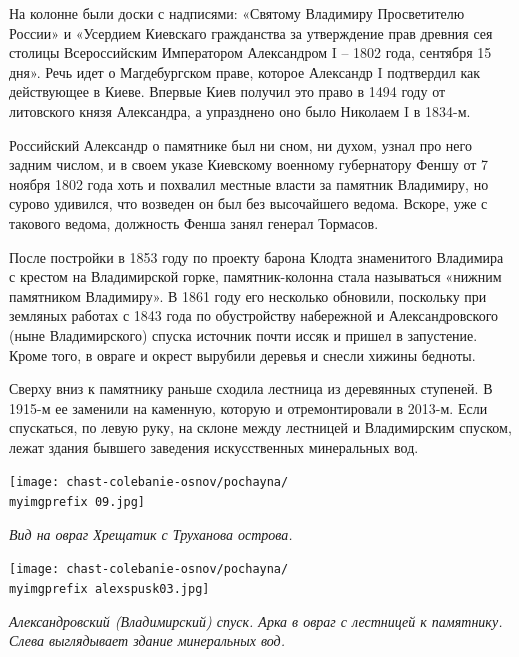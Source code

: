 На колонне были доски с надписями: «Святому Владимиру Просветителю России» и «Усердием Киевскаго гражданства за утверждение прав древния сея столицы Всероссийским Императором Александром I – 1802 года, сентября 15 дня». Речь идет о Магдебургском праве, которое Александр I подтвердил как действующее в Киеве. Впервые Киев получил это право в 1494 году от литовского князя Александра, а упразднено оно было Николаем I в 1834-м.

Российский Александр о памятнике был ни сном, ни духом, узнал про него задним числом, и в своем указе Киевскому военному губернатору Феншу от 7 ноября 1802 года хоть и похвалил местные власти за памятник Владимиру, но сурово удивился, что возведен он был без высочайшего ведома. Вскоре, уже с такового ведома, должность Фенша занял генерал Тормасов.

После постройки в 1853 году по проекту барона Клодта знаменитого Владимира с крестом на Владимирской горке, памятник-колонна стала называться «нижним памятником Владимиру». В 1861 году его несколько обновили, поскольку при земляных работах с 1843 года по обустройству набережной и Александровского (ныне Владимирского) спуска источник почти иссяк и пришел в запустение. Кроме того, в овраге и окрест вырубили деревья и снесли хижины бедноты.

Сверху вниз к памятнику раньше сходила лестница из деревянных ступеней. В 1915-м ее заменили на каменную, которую и отремонтировали в 2013-м. Если спускаться, по левую руку, на склоне между лестницей и Владимирским спуском, лежат здания бывшего заведения искусственных минеральных вод. 

\newpage

\begin{center}
\texttt{[image: chast-colebanie-osnov/pochayna/\\myimgprefix 09.jpg]}

\textit{Вид на овраг Хрещатик с Труханова острова.}
\end{center}

\begin{center}
\texttt{[image: chast-colebanie-osnov/pochayna/\\myimgprefix alexspusk03.jpg]}

\textit{Александровский (Владимирский) спуск. Арка в овраг с лестницей к памятнику. Слева выглядывает здание минеральных вод.}
\end{center}

